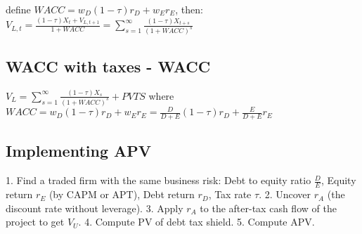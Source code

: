 define $WACC = w_D (1-\tau)r_D + w_E r_E$, then: \\

$V_{L,t} = \frac{(1-\tau)X_t + V_{L,t+1}}{1+WACC} = \sum_{s=1}^{\infty} \frac{(1-\tau)X_{t+s}}{(1+WACC)^s}$

\subsection*{WACC with taxes - WACC}

$V_L = \sum_{s=1}^{\infty} \frac{(1-\tau)X_{s}}{(1+WACC)^s} + PVTS$ where $WACC = w_D (1-\tau)r_D + w_E r_E = \frac{D}{D+E} (1-\tau) r_D + \frac{E}{D+E}r_E $

\subsection*{Implementing APV}

1. Find a traded firm with the same business risk: Debt to equity ratio $\frac{D}{E}$, Equity return $r_E$ (by CAPM or APT), Debt return $r_D$, Tax rate $\tau$.
2. Uncover $r_A$ (the discount rate without leverage).
3. Apply $r_A$ to the after-tax cash flow of the project to get $V_U$.
4. Compute PV of debt tax shield.
5. Compute APV.